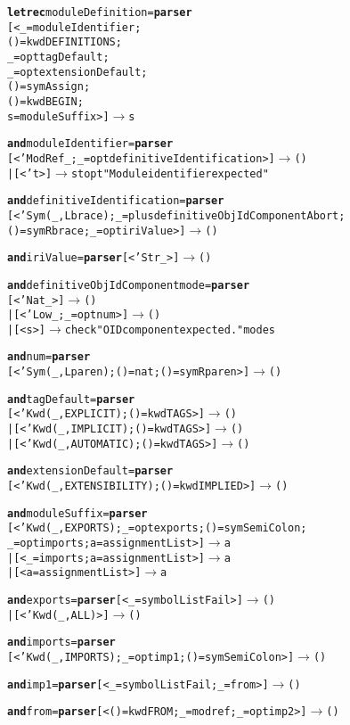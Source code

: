 \begin{alltt}
\textbf{let rec} moduleDefinition = \textbf{parser}
  [< \_=moduleIdentifier;
     ()=kwd DEFINITIONS;
     \_=opt tagDefault;
     \_=opt extensionDefault;
     ()=sym Assign;
     ()=kwd BEGIN;
     s=moduleSuffix >] \(\rightarrow\) s

\textbf{and} moduleIdentifier = \textbf{parser}
  [< 'ModRef \_; \_=opt definitiveIdentification >] \(\rightarrow\) ()
| [< 't >] \(\rightarrow\) stop t "Module identifier expected"

\textbf{and} definitiveIdentification = \textbf{parser}
  [< 'Sym (\_,Lbrace); \_=plus definitiveObjIdComponent Abort;
     ()=sym Rbrace; \_=opt iriValue >] \(\rightarrow\) ()

\textbf{and} iriValue = \textbf{parser} [< 'Str \_ >] \(\rightarrow\) ()

\textbf{and} definitiveObjIdComponent mode = \textbf{parser}
  [< 'Nat \_ >] \(\rightarrow\) ()
| [< 'Low \_; \_=opt num >] \(\rightarrow\) ()
| [< s >] \(\rightarrow\) check "OID component expected." mode s

\textbf{and} num = \textbf{parser}
  [< 'Sym (\_,Lparen); ()=nat; ()=sym Rparen >] \(\rightarrow\) ()

\textbf{and} tagDefault = \textbf{parser}
  [< 'Kwd (\_,EXPLICIT);  ()=kwd TAGS >] \(\rightarrow\) ()
| [< 'Kwd (\_,IMPLICIT);  ()=kwd TAGS >] \(\rightarrow\) ()
| [< 'Kwd (\_,AUTOMATIC); ()=kwd TAGS >] \(\rightarrow\) ()

\textbf{and} extensionDefault = \textbf{parser}
  [< 'Kwd (\_,EXTENSIBILITY); ()=kwd IMPLIED >] \(\rightarrow\) ()

\textbf{and} moduleSuffix = \textbf{parser}
  [< 'Kwd (\_,EXPORTS); \_=opt exports; ()=sym SemiColon;
     \_=opt imports; a=assignmentList >] \(\rightarrow\) a
|     [< \_=imports; a=assignmentList >] \(\rightarrow\) a
|                [< a=assignmentList >] \(\rightarrow\) a

\textbf{and} exports = \textbf{parser} [< \_=symbolList Fail >] \(\rightarrow\) ()
                   |      [< 'Kwd (\_,ALL) >] \(\rightarrow\) ()

\textbf{and} imports = \textbf{parser}
  [< 'Kwd (\_,IMPORTS); \_=opt imp1; ()=sym SemiColon >] \(\rightarrow\) ()

\textbf{and} imp1 = \textbf{parser} [< \_=symbolList Fail; \_=from >] \(\rightarrow\) ()

\textbf{and} from = \textbf{parser} [< ()=kwd FROM; \_=modref; \_=opt imp2 >] \(\rightarrow\) ()


\end{alltt}
